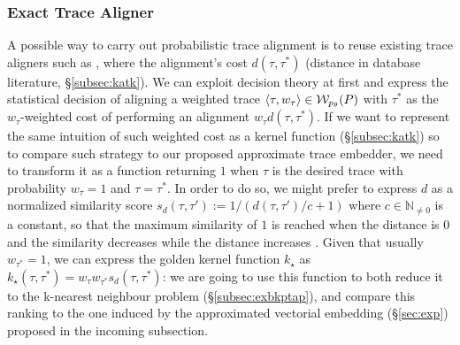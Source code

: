 \subsubsection{Exact Trace Aligner}\label{subsec:eta}
{A possible way to carry out probabilistic trace alignment is to reuse existing trace aligners such as \cite{LeoniM17}, where the alignment's cost $d(\tau,\tau^*)$ (distance in database literature, \S\ref{subsec:katk}). We can exploit decision theory at first \cite{dectheor} and express the statistical decision of aligning a weighted trace $\braket{\tau,w_\tau}\in\mathcal{W}_{p_\theta}(P)$ with $\tau^*$ as the $w_\tau$-weighted cost of performing an alignment $w_\tau d(\tau,\tau^*)$. If we want to represent the same intuition of such weighted cost as a kernel function (\S\ref{subsec:katk}) so to compare such strategy to our proposed approximate trace embedder, we need to transform it as a function returning $1$  when $\tau$ is the desired trace with probability $w_\tau=1$ and $\tau=\tau^*$. In order to do so, we might prefer to express $d$ as}
 a normalized similarity score $s_d(\tau,\tau'):=1/(d(\tau,\tau')/c+1)$ where $c\in\mathbb{N}_{\neq 0}$ is a constant, so that the maximum similarity of $1$ is reached when the distance is $0$ and the similarity decreases while the distance increases \cite{BergamiBM20}. %
 {Given that usually $w_{\tau^*}=1$, we can express the golden kernel function $k_\star$ as $k_\star(\tau,\tau^*)=w_\tau w_{\tau^*} s_d(\tau,\tau^*)$: we are going to use this function to both }%
 reduce {it} to the k-nearest neighbour problem{ (\S\ref{subsec:exbkptap}), and compare this ranking to the one induced by the approximated vectorial embedding (\S\ref{sec:exp}) proposed in the incoming subsection.}

